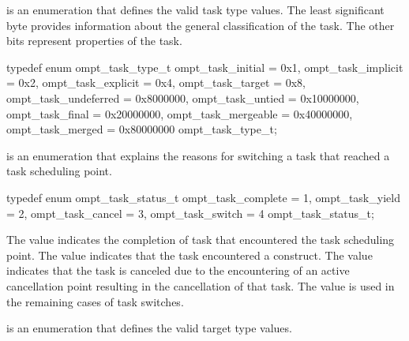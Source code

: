 
\label{sec:ompt_task_type_t}
 is an enumeration that defines the valid task type values.
The least significant byte provides information about the general classification of the task.
The other bits represent properties of the task.

\begin{ccppspecific}
\begin{omptEnum}
typedef enum ompt_task_type_t {
  ompt_task_initial                   = 0x1,
  ompt_task_implicit                  = 0x2,
  ompt_task_explicit                  = 0x4,
  ompt_task_target                    = 0x8,
  ompt_task_undeferred                = 0x8000000,
  ompt_task_untied                    = 0x10000000,
  ompt_task_final                     = 0x20000000,
  ompt_task_mergeable                 = 0x40000000,
  ompt_task_merged                    = 0x80000000
} ompt_task_type_t;
\end{omptEnum}
\end{ccppspecific}





\label{sec:ompt_task_status_t}
 is an enumeration that explains the
reasons for switching a task that reached  a task scheduling point.


\begin{ccppspecific}
\begin{omptEnum}
typedef enum ompt_task_status_t {
  ompt_task_complete  = 1,
  ompt_task_yield     = 2,
  ompt_task_cancel    = 3,
  ompt_task_switch    = 4
} ompt_task_status_t;
\end{omptEnum}
\end{ccppspecific}


The value  indicates the completion of task that
encountered the task scheduling point. The value  indicates
that the task encountered a  construct. The value  indicates
that the task is canceled due to the encountering of an active cancellation point resulting in the
cancellation of that task.
The value  is used in the remaining cases of task switches.


\label{sec:ompt_target_type_t}
 is an enumeration that defines the valid target type values.


